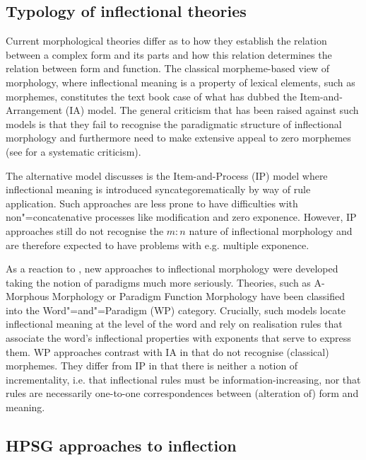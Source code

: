 \documentclass[output=paper
	        ,collection
	        ,collectionchapter
 	        ,biblatex
                ,babelshorthands
                ,newtxmath
                ,draftmode
                ,colorlinks, citecolor=brown
]{langscibook}
\begin{document}
{\subsection{Typology of inflectional theories}
\label{sec:InflTypology}

Current morphological theories differ as to how they establish the
relation between a complex form and its parts and how this relation
determines the relation between form and function. The classical
morpheme-based view of morphology, where inflectional meaning is a
property of lexical elements, such as morphemes, constitutes the text
book case of what \cite{Hockett54} has dubbed the Item-and-Arrangement
(IA) model.  The general criticism that has been raised against such
models is that they fail to recognise the paradigmatic structure of
inflectional morphology and furthermore need to make extensive appeal
to zero morphemes (see \citealp{Anderson92} for a systematic
criticism).

The alternative model \citet{Hockett54} discusses is the
Item-and-Process (IP) model where inflectional meaning is introduced
syncategorematically by way of rule application. Such approaches
are less prone to have difficulties with non"=concatenative processes
like modification and zero exponence. However, IP approaches still do
not recognise the $m:n$ nature of inflectional morphology and are
therefore expected to have problems with e.g. multiple exponence. 


As a reaction to \citet{Matthews72}, new approaches to inflectional
morphology were developed taking the notion of paradigms much more
seriously. Theories, such as A-Morphous Morphology \citep{Anderson92}
or Paradigm Function Morphology \citep{Stump01} have been classified
into the Word"=and"=Paradigm (WP) category. Crucially, such models
locate inflectional meaning at the level of the word and rely on
realisation rules that associate the word's inflectional properties
with exponents that serve to express them. WP approaches contrast with
IA in that do not recognise (classical) morphemes. They differ
from IP in that there is neither a  notion of incrementality,
i.e. that inflectional rules must be information-increasing, nor that
rules are necessarily one-to-one correspondences between (alteration
of) form and meaning. 


\subsection{HPSG approaches to inflection}
\label{sec:InflHPSG}

}
\end{document}
